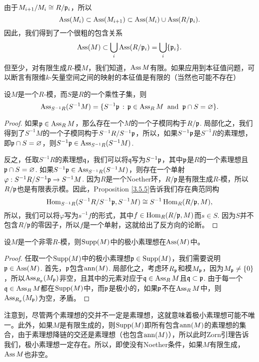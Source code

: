 由于$M_{i+1}/M_i\cong R/\mathfrak{p}_i$，所以
\[
	\operatorname{Ass}(M_i)\subset \operatorname{Ass}(M_{i+1})\subset \operatorname{Ass}(M_i)\cup \operatorname{Ass}(R/\mathfrak{p}_i).
\]
因此，我们得到了一个很粗的包含关系
\[
	\operatorname{Ass}(M)\subset \bigcup_i \operatorname{Ass}(R/\mathfrak{p}_i)=\bigcup_i \{\mathfrak{p}_i\}.
\]
但至少，对有限生成$R$-模$M$，我们知道，$\operatorname{Ass} M$有限。如果应用到本征值问题，可以断言有限维$k$-矢量空间之间的映射的本征值是有限的（当然也可能不存在）

\begin{pro}
设$M$是一个$R$-模，而$S$是$R$的一个乘性子集，则
\[
	\operatorname{Ass}_{S^{-1}R}(S^{-1}M)=\{S^{-1}\mathfrak{p}\,:\,\mathfrak{p}\in \operatorname{Ass}_RM\;\;\text{and}\;\;\mathfrak p\cap S=\varnothing\}.
\]
\end{pro}

\begin{proof}
如果$\mathfrak{p}\in \operatorname{Ass}_R M$，那么存在一个$M$的一个子模同构于$R/\mathfrak{p}$. 局部化之，我们得到了$S^{-1}M$的一个子模同构于$S^{-1}R/S^{-1}\mathfrak{p}$，所以，如果$S^{-1}\mathfrak{p}$是$S^{-1}R$的素理想，即$\mathfrak{p}\cap S= \varnothing$，则$S^{-1}\mathfrak{p}\in\operatorname{Ass}_{S^{-1}R}(S^{-1}M)$.

反之，任取$S^{-1}R$的素理想$\mathfrak{q}$，我们可以将$\mathfrak{q}$写为$S^{-1}\mathfrak{p}$，其中$\mathfrak{p}$是$R$的一个素理想且$\mathfrak{p}\cap S=\varnothing$. 如果$S^{-1}\mathfrak{p}\in \operatorname{Ass}_{S^{-1}R}(S^{-1}M)$，则存在一个单射$\varphi:S^{-1}R/S^{-1}\mathfrak{p}\to S^{-1}M$. 因为$R$是一个Noether环，$R/\mathfrak{p}$是有限生成$R$-模，所以$R/\mathfrak{p}$也是有限表示模。因此，Proposition \ref{3.5.5}告诉我们存在典范同构
\[
	\operatorname{Hom}_{S^{-1}R}(S^{-1}R/S^{-1}\mathfrak{p},S^{-1}M)\cong S^{-1}\operatorname{Hom}_R(R/\mathfrak{p},M),
\]
所以，我们可以将$\varphi$写为$s^{-1}f$的形式，其中$f\in \operatorname{Hom}_R(R/\mathfrak{p},M)$而$s\in S$. 因为$S$并不包含$R/\mathfrak{p}$的零因子，所以$f$是一个单射，这就给出了反方向的论断。
\end{proof}

\begin{pro}\label{pro:5.1.9}
设$M$是一个非零$R$-模，则$\operatorname{Supp}(M)$中的极小素理想在$\operatorname{Ass} (M)$中。
\end{pro}

\begin{proof}
任取一个$\operatorname{Supp}(M)$中的极小素理想$\mathfrak{p}\in \operatorname{Supp}(M)$，我们需要说明$\mathfrak{p}\in \operatorname{Ass}(M)$. 首先，$\mathfrak{p}$包含$\operatorname{ann}(M)$. 局部化之，考虑环$R_{\mathfrak{p}}$和模$M_{\mathfrak{p}}$，因为$M_{\mathfrak{p}}\neq \{0\}$，所以$\operatorname{Ass}_{R_{\mathfrak{p}}}(M_{\mathfrak{p}})$非空，且其中的元素对应于$\mathfrak{q}\in \operatorname{Ass}_R M$且$\mathfrak{q}\subset \mathfrak{p}$. 由于每一个$\mathfrak{q}\in \operatorname{Ass}_R M$都在$\operatorname{Supp}(M)$中，而$\mathfrak{p}$是极小的，如果$\mathfrak{p}$不在$\operatorname{Ass}_R M$中，则$\operatorname{Ass}_{R_{\mathfrak{p}}}(M_{\mathfrak{p}})$为空，矛盾。
\end{proof}

注意到，尽管两个素理想的交并不一定是素理想，这就意味着极小素理想可能不唯一。此外，如果$M$是有限生成的，则$\operatorname{Supp}(M)$即所有包含$\operatorname{ann}(M)$的素理想的集合，由于素理想降链的交还是素理想（也包含$\operatorname{ann}(M)$），所以此时Zorn引理告诉我们，极小素理想一定存在。所以，即使没有Noether条件，如果$M$有限生成，$\operatorname{Ass} M$也非空。

